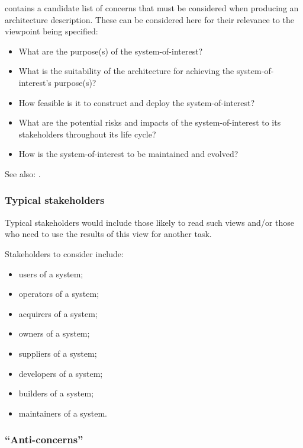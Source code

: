  
 contains a candidate list of concerns that must be considered
when producing an architecture description. These can be considered
here for their relevance to the viewpoint being specified:
\begin{itemize}
\item What are the purpose(s) of the system-of-interest?
\item What is the suitability of the architecture for achieving the
  system-of-interest's purpose(s)?
\item How feasible is it to construct and deploy the
  system-of-interest?
\item What are the potential risks and impacts of the
  system-of-interest to its stakeholders throughout its life cycle?
\item How is the system-of-interest to be maintained and evolved?
\end{itemize}

See also: .

\subsubsection{Typical stakeholders} 


Typical stakeholders would include those likely to read such views
and/or those who need to use the results of this view for another
task.

Stakeholders to consider include:
\begin{itemize}
\item users of a system; 
\item operators of a system; 
\item acquirers of a system;
\item owners of a system; 
\item suppliers of a system; 
\item developers of a system; 
\item builders of a system; 
\item maintainers of a system.
\end{itemize}

\subsubsection{``Anti-concerns'' \Optional} 

